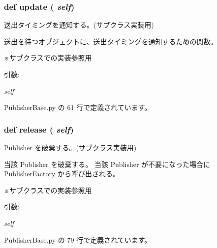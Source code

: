 \subsubsection{\setlength{\rightskip}{0pt plus 5cm}def update ( {\em self})}\label{classsource__py_1_1_publisher_base_1_1_publisher_base_be52b977c101e59f342489ed18140819}


送出タイミングを通知する。(サブクラス実装用) 

送出を待つオブジェクトに、送出タイミングを通知するための関数。\par
 ※サブクラスでの実装参照用

\begin{Desc}
\item[引数:]
\begin{description}
\item[{\em self}]\end{description}
\end{Desc}


 PublisherBase.py の 61 行で定義されています。
\subsubsection{\setlength{\rightskip}{0pt plus 5cm}def release ( {\em self})}\label{classsource__py_1_1_publisher_base_1_1_publisher_base_8cac5263cadffde59ee3fa4fcb8d1f91}


Publisher を破棄する。(サブクラス実装用) 

当該 Publisher を破棄する。 当該 Publisher が不要になった場合に PublisherFactory から呼び出される。\par
 ※サブクラスでの実装参照用

\begin{Desc}
\item[引数:]
\begin{description}
\item[{\em self}]\end{description}
\end{Desc}


 PublisherBase.py の 79 行で定義されています。